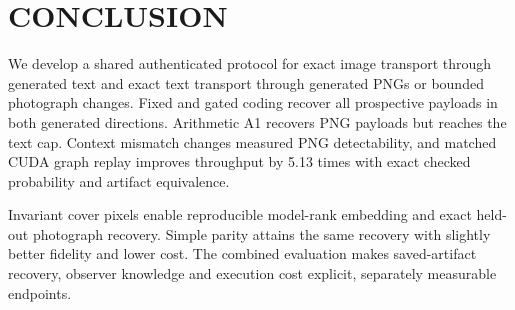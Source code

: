 \section{\uppercase{Conclusion}}
We develop a shared authenticated protocol for exact image transport through generated text and exact text transport through generated PNGs or bounded photograph changes. Fixed and gated coding recover all prospective payloads in both generated directions. Arithmetic A1 recovers PNG payloads but reaches the text cap. Context mismatch changes measured PNG detectability, and matched CUDA graph replay improves throughput by 5.13 times with exact checked probability and artifact equivalence.\aifootnote

Invariant cover pixels enable reproducible model-rank embedding and exact held-out photograph recovery. Simple parity attains the same recovery with slightly better fidelity and lower cost. The combined evaluation makes saved-artifact recovery, observer knowledge and execution cost explicit, separately measurable endpoints.
